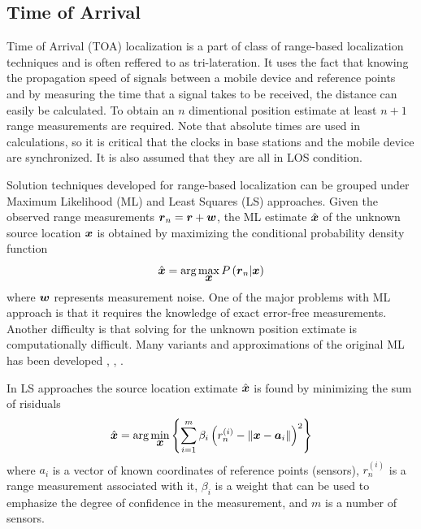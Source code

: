 \subsection{Time of Arrival }

Time of Arrival (TOA) localization is a part of class of range-based localization techniques and is often reffered to as tri-lateration. It uses the fact that knowing the propagation speed of  signals between a mobile device and reference points and by measuring the time that a signal takes to be received, the distance can easily be calculated. To obtain an $n$  dimentional position estimate at least $n+1$ range measurements are required. Note that absolute times are used in calculations, so it is critical that the  clocks in base stations and the mobile device are synchronized. It is also assumed that they are all in LOS condition. %

Solution techniques developed for range-based localization can be grouped under Maximum Likelihood (ML) and Least Squares (LS) approaches. 
Given the observed range measurements $\mbox{\boldmath$r$}_n = \mbox{\boldmath$r$} + \mbox{\boldmath$w$}$, the ML estimate $\hat{\mbox{\boldmath$x$}}$ of the unknown source location $\mbox{\boldmath$x$}$ is obtained by maximizing the conditional probability density function 
\begin{equation}
\nonumber
\hat{\mbox{\boldmath$x$}} = \mbox{arg}\max_{\mbox{\boldmath$x$}} P\left(\mbox{\boldmath$r$}_n|\mbox{\boldmath$x$}\right)
\end{equation}
where $\mbox{\boldmath$w$}$ represents measurement noise. One of the major problems with ML approach is that it requires the knowledge of exact error-free measurements. Another difficulty is that solving for the unknown position extimate is computationally difficult. Many variants and approximations of the original ML has been  developed \cite{Guvenc}, \cite{Guvenc2}, \cite{HoML}.

In LS approaches the source location extimate $\hat{\mbox{\boldmath$x$}}$ is found by minimizing the sum of risiduals \cite{GeoLoc}
\begin{equation}
\nonumber
\hat{\mbox{\boldmath$x$}} = \mbox{arg}\min_{\mbox{\boldmath$x$}} \left\lbrace \sum_{i=1}^m \beta_i\left(r_n^{(i)} - \|\mbox{\boldmath$x$} - \mbox{\boldmath$a$}_i\|\right)^2 \right\rbrace
\end{equation}
where $a_i$ is a vector of known coordinates of reference points (sensors),   $r_n^{(i)}$ is a range measurement associated with it, $\beta_i$ is a weight
that can be used to emphasize  the degree of confidence in the measurement, and $m$ is a number of sensors.


